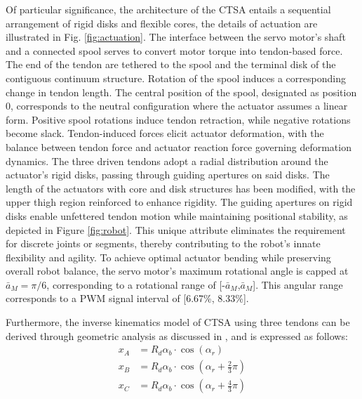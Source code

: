 Of particular significance, the architecture of the \ac{CTSA} entails a sequential arrangement of rigid disks and flexible cores, the details of actuation are illustrated in Fig. \ref{fig:actuation}. The interface between the servo motor's shaft and a connected spool serves to convert motor torque into tendon-based force. The end of the tendon are tethered to the spool and the terminal disk of the contiguous continuum structure. Rotation of the spool induces a corresponding change in tendon length. The central position of the spool, designated as position 0, corresponds to the neutral configuration where the actuator assumes a linear form. Positive spool rotations induce tendon retraction, while negative rotations become slack. Tendon-induced forces elicit actuator deformation, with the balance between tendon force and actuator reaction force governing deformation dynamics. The three driven tendons adopt a radial distribution around the actuator's rigid disks, passing through guiding apertures on said disks. The length of the actuators with core and disk structures has been modified, with the upper thigh region reinforced to enhance rigidity. The guiding apertures on rigid disks enable unfettered tendon motion while maintaining positional stability, as depicted in Figure \ref{fig:robot}. This unique attribute eliminates the requirement for discrete joints or segments, thereby contributing to the robot's innate flexibility and agility. To achieve optimal actuator bending while preserving overall robot balance, the servo motor's maximum rotational angle is capped at $\bar{a}_M = \pi/6$, corresponding to a rotational range of [-$\bar{a}_M$,$\bar{a}_M$]. This angular range corresponds to a \ac{PWM} signal interval of [6.67\%, 8.33\%].


Furthermore, the inverse kinematics model of \ac{CTSA} using three tendons can be derived through geometric analysis as discussed in \cite{muralidharanSoftQuadrupedRobot2021}, and is expressed as follows:
\begin{equation}
    \begin{aligned}
    x_A &= R_d\alpha_b\cdot{\cos(\alpha_r)} \\
    x_B &= R_d\alpha_b\cdot{\cos(\alpha_r+\frac{2}{3}\pi)} \\
    x_C &= R_d\alpha_b\cdot{\cos(\alpha_r+\frac{4}{3}\pi)}
    \end{aligned}
    \label{eq:value2motor}
\end{equation}

